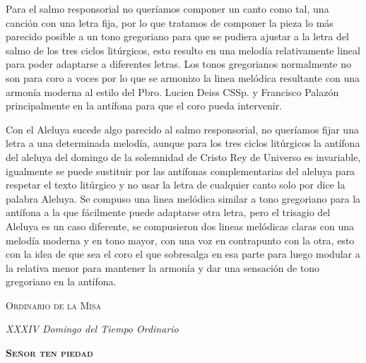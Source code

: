 \documentclass[12pt, letterpaper]{report}
\begin{document}
    Para el salmo responsorial no quer\'iamos componer un canto como tal, una canci\'on con una letra fija, por lo que tratamos de
    componer la pieza lo m\'as parecido posible a un tono gregoriano para que se pudiera ajustar a la letra del salmo de
    los tres ciclos lit\'urgicos, esto resulto en una melod\'ia relativamente lineal para poder adaptarse a diferentes letras.
    Los tonos gregorianos normalmente no son para coro a voces por lo que se armonizo la linea mel\'odica resultante con una armon\'ia
    moderna al estilo del Pbro. Lucien Deiss CSSp. y Francisco Palaz\'on principalmente en la ant\'ifona para que el coro pueda intervenir.

    Con el Aleluya sucede algo parecido al salmo responsorial, no quer\'iamos fijar una letra a una determinada melod\'ia, aunque para los tres
    ciclos lit\'urgicos la ant\'ifona del aleluya del domingo de la solemnidad de Cristo Rey de Universo es invariable, igualmente se puede
    sustituir por las ant\'ifonas complementarias del aleluya para respetar el texto lit\'urgico y no usar la letra de cualquier canto solo por
    dice la palabra Aleluya. Se compuso una linea mel\'odica similar a tono gregoriano para la ant\'ifona a la que f\'acilmente puede adaptarse otra letra,
    pero el trisagio del Aleluya es un caso diferente, se compusieron dos lineas mel\'odicas claras con una melod\'ia moderna y en tono mayor,
    con una voz en contrapunto con la otra, esto con la idea de que sea el coro el que sobresalga en esa parte para luego modular a la relativa
    menor para mantener la armon\'ia y dar una sensaci\'on de tono gregoriano en la ant\'ifona.
    \clearpage

    \begin{center}
        \vspace*{8cm}
        { \scshape \Huge Ordinario de la Misa \par}
        \vspace{1cm}
        { \itshape \Large XXXIV Domingo del Tiempo Ordinario \par}
    \end{center}
    \clearpage

    \begin{center}
        {\scshape \Huge {\bfseries Se\~nor ten piedad}}
    \end{center}
\end{document}

